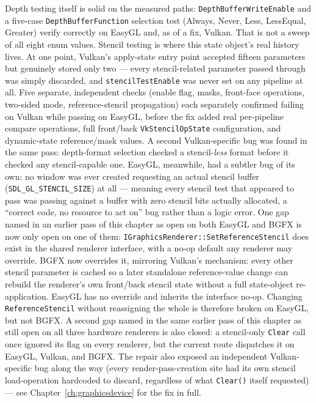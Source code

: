 Depth testing itself is solid on the measured paths: \texttt{DepthBufferWriteEnable} and a
five-case \texttt{DepthBufferFunction} selection test (Always, Never, Less, LessEqual, Greater)
verify correctly on EasyGL and, as of a fix, Vulkan. That is not a sweep of all eight enum values.
Stencil testing is where this state object's real history lives. At one point, Vulkan's
apply-state entry point accepted fifteen parameters but genuinely stored only two --- every
stencil-related parameter passed through was simply discarded, and \texttt{stencilTestEnable}
was never set on any pipeline at all. Five separate, independent checks (enable flag, masks,
front-face operations, two-sided mode, reference-stencil propagation) each separately
confirmed failing on Vulkan while passing on EasyGL, before the fix added real per-pipeline
compare operations, full front/back \texttt{VkStencilOpState} configuration, and dynamic-state
reference/mask values. A second Vulkan-specific bug was found in the same pass: depth-format
selection checked a stencil-\emph{less} format before it checked any stencil-capable one.
EasyGL, meanwhile, had a subtler bug of its own: no window was ever created requesting an
actual stencil buffer (\texttt{SDL\_GL\_STENCIL\_SIZE}) at all --- meaning every stencil test
that appeared to pass was passing against a buffer with zero stencil bits actually allocated,
a ``correct code, no resource to act on'' bug rather than a logic error. One gap named in an
earlier pass of this chapter as open on both EasyGL and BGFX is now only open on one of them:
\texttt{IGraphicsRenderer::SetReferenceStencil} does exist in the shared renderer interface, with
a no-op default any renderer may override. BGFX now overrides it, mirroring Vulkan's mechanism:
every other stencil parameter is cached so a later standalone reference-value change can
rebuild the renderer's own front/back stencil state without a full state-object
re-application. EasyGL has no override and inherits the interface no-op. Changing
\texttt{ReferenceStencil} without reassigning the whole
 is therefore broken on EasyGL, but not BGFX. A
second gap named in the same earlier pass of this chapter as still open on all three hardware
renderers is also closed: a stencil-only \texttt{Clear} call once ignored its
flag on every renderer, but the current route dispatches it on EasyGL, Vulkan, and BGFX. The
repair also exposed an independent
Vulkan-specific bug along the way (every render-pass-creation site had its own stencil
load-operation hardcoded to discard, regardless of what \texttt{Clear()} itself requested) ---
see Chapter~\ref{ch:graphicsdevice} for the fix in full.

